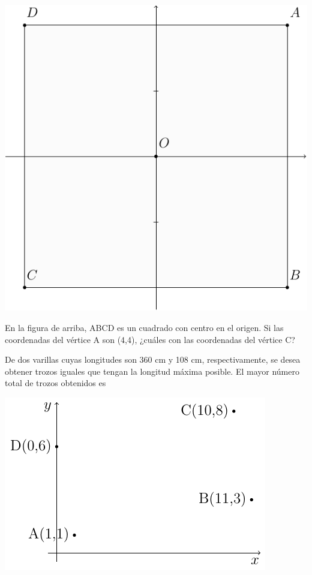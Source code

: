 \documentclass[letterpaper,10pt]{examdesign}
\begin{document}
\begin{multiplechoice}[rearrange=yes,keycolumns=4,examcolumns=2]
\begin{block}
\hspace*{.5in}\includegraphics[scale=.75]{Images/cuadrado.pdf}
\begin{question}
En la figura de arriba, ABCD es un cuadrado con centro en el origen. Si las coordenadas del vértice A son (4,4), ¿cuáles con las coordenadas del vértice C?
\end{question}
\end{block}
\begin{question}
De dos varillas cuyas longitudes son 360 cm y 108 cm, respectivamente, se desea obtener trozos iguales que tengan la longitud máxima posible. El mayor número total de trozos obtenidos es
   
\end{question}
\begin{block}
\hspace*{1cm}\includegraphics[scale=.8]{Images/puntos.pdf} 

\end{block}
\end{multiplechoice}
\end{document}
